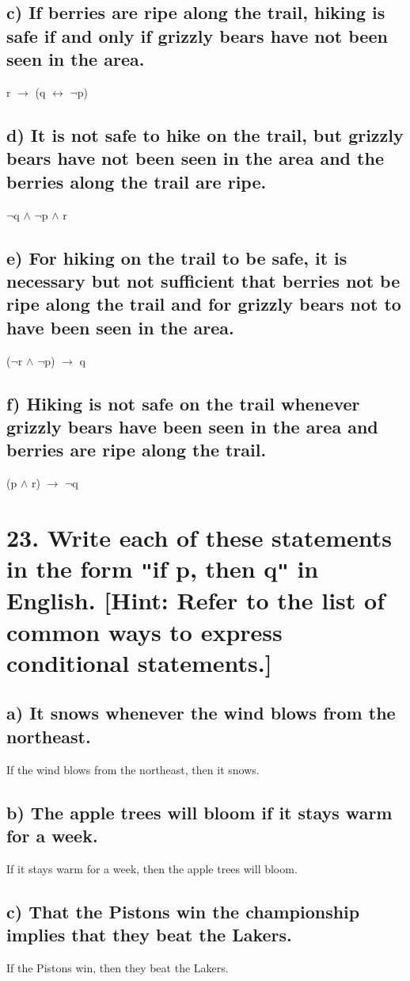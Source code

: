 \documentclass[11pt, oneside]{article} %
\numberwithin{equation}{section} %
\numberwithin{figure}{section} %
\numberwithin{table}{section} %
\begin{document}
\subsection{c) If berries are ripe along the trail, hiking is safe if and
only if grizzly bears have not been seen in the area.}
r $\rightarrow$ (q $\leftrightarrow$ $\neg$p)
\subsection{d) It is not safe to hike on the trail, but grizzly bears have not been seen in the area and the berries along the trail
are ripe.}
$\neg$q $\wedge$ $\neg$p $\wedge$ r
\subsection{e) For hiking on the trail to be safe, it is necessary but not
sufficient that berries not be ripe along the trail and
for grizzly bears not to have been seen in the area.}
($\neg$r $\wedge$ $\neg$p) $\rightarrow$ q
\subsection{f) Hiking is not safe on the trail whenever grizzly bears have been seen in the area and berries are ripe along
the trail.}
(p $\wedge$ r) $\rightarrow$ $\neg$q


\section{23. Write each of these statements in the form \texttt{"}if p, then q\texttt{"} in English. [Hint: Refer to the list of common ways to express conditional statements.]}
\subsection{a) It snows whenever the wind blows from the northeast.}
If the wind blows from the northeast, then it snows.
\subsection{b) The apple trees will bloom if it stays warm for a week.}
If it stays warm for a week, then the apple trees will bloom.
\subsection{c) That the Pistons win the championship implies that
they beat the Lakers.}
If the Pistons win, then they beat the Lakers.
\end{document}

